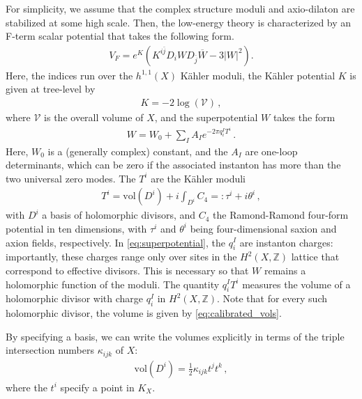 \documentclass[11pt,dvipsnames]{article}
\theoremstyle{definition}
\begin{document}
For simplicity, we assume that the complex structure moduli and axio-dilaton are stabilized at some high scale. Then, the low-energy theory is characterized by an F-term scalar potential that takes the following form.
\begin{align}
    V_F  = e^K (K^{i\bar{j}} D_i W D_{\bar{j}} \overline{W} - 3 |W|^2).
\end{align}
Here, the indices run over the $h^{1,1}(X)$ K\"ahler moduli, the K\"ahler potential $K$ is given at tree-level by
\begin{align}
    K = -2 \log(\mathcal{V})\,,
\end{align}
where $\mathcal{V}$ is the overall volume of $X$, and the superpotential $W$ takes the form
\begin{align}
    W = W_0 + \sum_{I} A_I e^{-2\pi q^I_i T^i}\,.
    \label{eq:superpotential}
\end{align}
Here, $W_0$ is a (generally complex) constant, and the $A_I$ are one-loop determinants, which can be zero if the associated instanton has more than the two universal zero modes. The $T^i$ are the K\"ahler moduli
\begin{align}
    T^i = \text{vol}(D^i) + i \int_{D^i} C_4 =: \tau^i + i \theta^i\,,
\end{align}
with $D^i$ a basis of holomorphic divisors, and $C_4$ the Ramond-Ramond four-form potential in ten dimensions, with $\tau^i$ and $\theta^i$ being four-dimensional saxion and axion fields, respectively. In \eqref{eq:superpotential}, the $q^I_i$ are instanton charges: importantly, these charges range only over sites in the $H^2(X, \mathbb{Z})$ lattice that correspond to effective divisors. This is necessary so that $W$ remains a holomorphic function of the moduli. The quantity $q^I_i T^i$ measures the volume of a holomorphic divisor with charge $q^I_i$ in $H^2(X, \mathbb{Z})$. Note that for every such holomorphic divisor, the volume is given by \eqref{eq:calibrated_vols}. 

By specifying a basis, we can write the volumes explicitly in terms of the triple intersection numbers $\kappa_{ijk}$ of $X$:
\begin{align}
    \text{vol}(D^i) = \frac{1}{2} \kappa_{ijk} t^j t^k\,,
\end{align}
where the $t^i$ specify a point in $K_X$.
\end{document}
